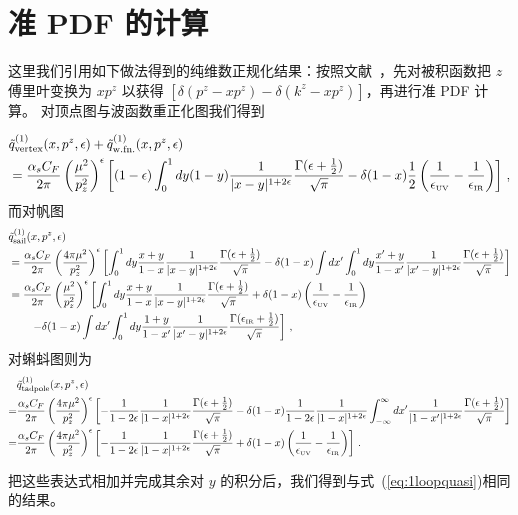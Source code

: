 \section{准 PDF 的计算}
\label{sec:quasi}

这里我们引用如下做法得到的纯维数正规化结果：按照文献~\cite{Xiong:2013bka,Stewart:2017tvs}，先对被积函数把 $z$ 傅里叶变换为 $x p^z$ 以获得 $[\delta(p^z-xp^z)-\delta(k^z-xp^z)]$，再进行准 PDF 计算。
对顶点图与波函数重正化图我们得到
\begin{widetext}

\begin{align}
	&\tilde{q}^{(1)}_\text{vertex}(x,p^z,\epsilon)
	+ \tilde{q}^{(1)}_\text{w.fn.}(x,p^z,\epsilon)\nonumber\\
	&={\alpha_sC_F\over 2\pi}\left({\mu^2\over p_z^2}\right)^\epsilon \left[ (1-\epsilon)\int_0^1 dy (1-y){1\over |x-y|^{1+2\epsilon}}{\Gamma(\epsilon+{1\over2})\over\sqrt{\pi}}- \delta(1-x){1\over2} \left({1\over\epsilon_{\mbox{\tiny UV}}} - {1\over \epsilon_{\mbox{\tiny IR}}}\right)\right]\,,
\end{align}
而对帆图
\begin{align}
	&\tilde{q}^{(1)}_\text{sail}(x,p^z,\epsilon) \nonumber\\
	&= {\alpha_sC_F\over 2\pi}\left({4\pi\mu^2\over p_z^2}\right)^\epsilon\left[\int_0^1 dy {x+y\over 1-x}{1\over |x-y|^{1+2\epsilon}}{\Gamma(\epsilon+{1\over2})\over\sqrt{\pi}}-\delta(1-x)\int dx'\int_0^1 dy {x'+y\over 1-x'}{1\over |x'-y|^{1+2\epsilon}}{\Gamma(\epsilon+{1\over2})\over\sqrt{\pi}} \right]\nonumber\\
	&= {\alpha_sC_F\over 2\pi}\left({\mu^2\over p_z^2}\right)^\epsilon\left[\int_0^1 dy {x+y\over 1-x}{1\over |x-y|^{1+2\epsilon}}{\Gamma(\epsilon+{1\over2})\over\sqrt{\pi}}+\delta(1-x)\left({1\over\epsilon_{\mbox{\tiny UV}}} - {1\over \epsilon_{\mbox{\tiny IR}}}\right)\right.\nonumber\\
	&\qquad\left. -\delta(1-x)\int dx'\int_0^1 dy {1+y\over 1-x'}{1\over |x'-y|^{1+2\epsilon}}{\Gamma(\epsilon_{\mbox{\tiny IR}}+{1\over2})\over\sqrt{\pi}}\right]\,,
	\end{align}
对蝌蚪图则为
	\begin{align}
	&\tilde{q}^{(1)}_\text{tadpole}(x,p^z,\epsilon)\nonumber\\
	=& {\alpha_sC_F\over 2\pi}\left({4\pi\mu^2\over p_z^2}\right)^\epsilon \left[-{1\over 1-2\epsilon}{1\over |1-x|^{1+2\epsilon}}{\Gamma(\epsilon+{1\over2})\over\sqrt{\pi}} -\delta(1-x) {1\over 1-2\epsilon}{1\over |1-x|^{1+2\epsilon}}\int_{-\infty}^\infty dx' {1\over |1-x'|^{1+2\epsilon}}{\Gamma(\epsilon+{1\over2})\over\sqrt{\pi}}\right]\nonumber\\
	=& {\alpha_sC_F\over 2\pi}\left({4\pi\mu^2\over p_z^2}\right)^\epsilon \left[-{1\over 1-2\epsilon}{1\over |1-x|^{1+2\epsilon}}{\Gamma(\epsilon+{1\over2})\over\sqrt{\pi}} +\delta(1-x)\left({1\over\epsilon_{\mbox{\tiny UV}}} - {1\over \epsilon_{\mbox{\tiny IR}}}\right) \right]\,.
	\end{align}

\end{widetext}
把这些表达式相加并完成其余对 $y$ 的积分后，我们得到与式~(\ref{eq:1loopquasi})相同的结果。


